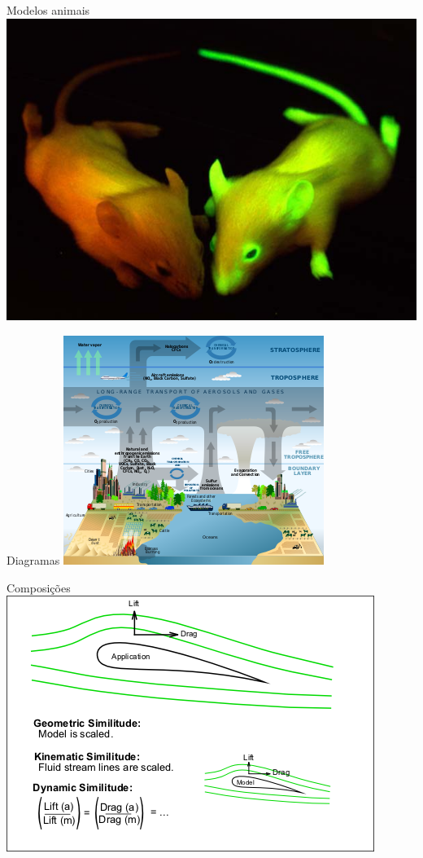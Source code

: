 \documentclass{beamer}
\begin{document}
\begin{frame}{Modelos animais}
  \centering
  \includegraphics[width=\textwidth]{modelos/GFP_hiir}
\end{frame}

\begin{frame}{Diagramas}
  \centering
  \includegraphics[height=\textheight]{modelos/Atmosphere_composition_diagram-en}
\end{frame}

\begin{frame}{Composições}
  \centering
  \includegraphics[width=\textwidth]{modelos/Similitude_(model)}
\end{frame}
\end{document}

